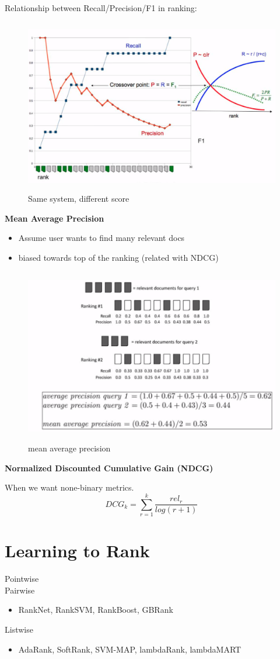 \documentclass{article}
\begin{document}
\begin{CJK*}{UTF8}{gbsn}
Relationship between Recall/Precision/F1 in ranking:
\begin{figure}[H]
\centering
\includegraphics[width=4.5in,height=3in]{rank1}
\caption{Same system, different score}
\end{figure}

\textbf{Mean Average Precision}
\begin{itemize}
\item Assume user wants to find many relevant docs
\item biased towards top of the ranking (related with NDCG)
\end{itemize}
\begin{figure}[H]
\centering
\includegraphics[width=5in,height=3in]{map}
\caption{mean average precision}
\end{figure}

\textbf{Normalized Discounted Cumulative Gain (NDCG)}

When we want none-binary metrics.
$$DCG_{k}=\sum_{r=1}^{k}\frac{rel_{r}}{log(r+1)}$$

\section{Learning to Rank}
\noindent
Pointwise
\\
Pairwise
\begin{itemize}
\item RankNet, RankSVM, RankBoost, GBRank
\end{itemize}
Listwise
\begin{itemize}
\item AdaRank, SoftRank, SVM-MAP, lambdaRank, lambdaMART
\end{itemize}


\end{CJK*}
\end{document}
